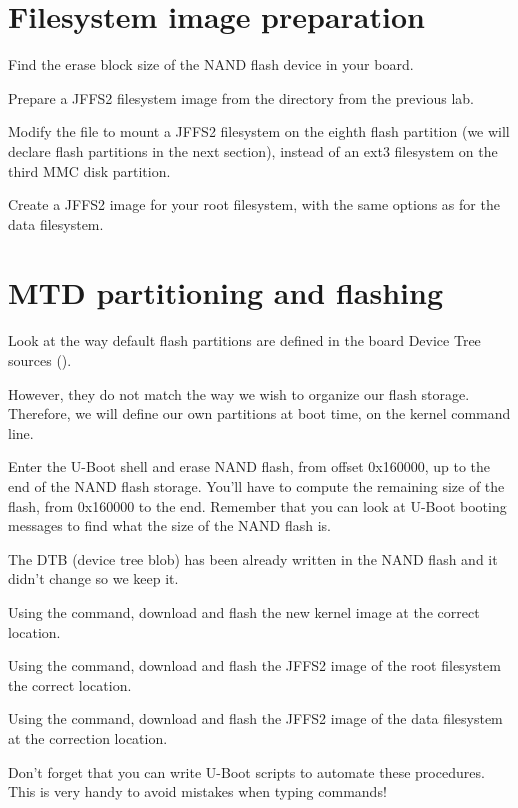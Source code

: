\section{Filesystem image preparation}

Find the erase block size of the NAND flash device in your board.

Prepare a JFFS2 filesystem image from the 
directory from the previous lab.

Modify the  file to mount a JFFS2 filesystem on
the eighth flash partition (we will declare flash partitions in the
next section), instead of an ext3 filesystem on the third MMC disk
partition.

Create a JFFS2 image for your root filesystem, with the same options
as for the data filesystem.

\section{MTD partitioning and flashing}

Look at the way default flash partitions are defined in the board
Device Tree sources
().

However, they do not match the way we wish to organize our flash
storage. Therefore, we will define our own partitions at boot time,
on the kernel command line.

Enter the U-Boot shell and erase NAND flash, from offset 0x160000,
up to the end of the NAND flash storage. You'll have to compute the
remaining size of the flash, from 0x160000 to the end. Remember that
you can look at U-Boot booting messages to find what the size of
the NAND flash is.

The DTB (device tree blob) has been already written in the NAND flash
and it didn't change so we keep it.

Using the  command, download and flash the new kernel
image at the correct location.

Using the  command, download and flash the JFFS2 image
of the root filesystem the correct location.

Using the  command, download and flash the JFFS2 image of
the data filesystem at the correction location.

Don't forget that you can write U-Boot scripts to automate these
procedures. This is very handy to avoid mistakes when typing commands!

